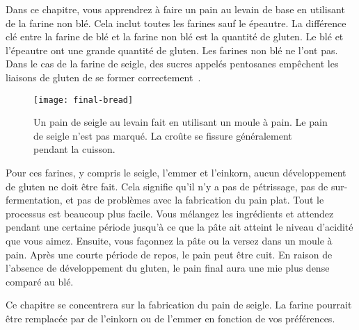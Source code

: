 \begin{quoting}
Dans ce chapitre, vous apprendrez à faire un pain au levain de base
en utilisant de la farine non blé. Cela inclut toutes les farines sauf le épeautre.
La différence clé entre la farine de blé et la farine non blé est
la quantité de gluten. Le blé et l'épeautre ont une grande quantité
de gluten. Les farines non blé ne l'ont pas. Dans le cas de la farine de seigle,
des sucres appelés pentosanes empêchent les liaisons de gluten de se former correctement~\cite{rye+pentosans}.
\end{quoting}

\begin{figure}[!htb]
  \texttt{[image: final-bread]}
  \caption[Pain de seigle au levain]{Un pain de seigle au levain fait en utilisant un moule à pain.
      Le pain de seigle n'est pas marqué. La croûte se fissure généralement pendant
      la cuisson.}%
  \label{fig:non-wheat-final-bread}
\end{figure}

Pour ces farines, y compris le seigle, l'emmer et l'einkorn, aucun développement
de gluten ne doit être fait. Cela signifie qu'il n'y a pas de pétrissage,
pas de sur-fermentation, et pas de problèmes avec la fabrication du pain plat.
Tout le processus
est beaucoup plus facile. Vous mélangez les ingrédients et
attendez pendant une certaine période jusqu'à ce que la pâte ait
atteint le niveau d'acidité que vous aimez. Ensuite, vous
façonnez la pâte ou la versez dans un moule à pain. Après une courte période de repos,
le pain peut être cuit. En raison de l'absence
de développement du gluten, le pain final aura une mie plus dense
comparé au blé.

\begin{flowchart}[!htb]
\begin{center}
  
  \caption[Processus pour pain au levain non blé]{Une visualisation du
      processus pour faire du pain au levain non blé. Le processus est beaucoup plus simple
      que de faire du pain au levain de blé. Il n'y a pas de développement de gluten. Les
      ingrédients sont simplement mélangés ensemble.}%
  \label{fig:non-wheat-sourdough}
\end{center}
\end{flowchart}

Ce chapitre se concentrera sur la fabrication du pain de seigle. La farine pourrait
être remplacée par de l'einkorn ou de l'emmer en fonction de vos préférences.

